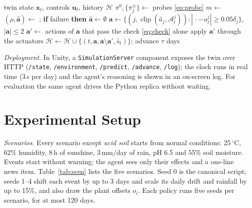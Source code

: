 \documentclass[conference]{IEEEtran}
\newcommand{\clip}{\operatorname{clip}}
\begin{document}
\begin{algorithm}[t]
\caption{One agent tick}\label{alg:tick}
\small
\begin{algorithmic}[1]
\Require twin state $\mathbf x_t$, controls $\mathbf u_t$, history $\mathcal H$
\State $\pi^0,\{\pi_j^\pm\}\gets$ probes \eqref{eq:probe} 
\State $m\gets$ 
\State $(\rho,\hat{\mathbf a})\gets$ ; \textbf{if} failure \textbf{then} $\hat{\mathbf a}\gets\emptyset$
\State $\mathbf a\gets\{(j,\clip(\hat a_j,\mathcal A_t^j)) : |\,\cdot-u_t^j|\ge0.05\delta_j\}$, $|\mathbf a|\le2$
\State $\mathbf a'\gets$ actions of $\mathbf a$ that pass the check \eqref{eq:check} alone
  \State apply $\mathbf a'$ through the actuators
\EndIf
\State $\mathcal H\gets\mathcal H\cup\{(t,\mathbf a,\mathbf a\setminus\mathbf a',\hat s_t)\}$; advance $\tau$ days
\end{algorithmic}
\end{algorithm}

\textit{Deployment.} In Unity, a \texttt{SimulationServer} component exposes the twin over HTTP
(\texttt{/state}, \texttt{/environment}, \texttt{/predict}, \texttt{/advance}, \texttt{/log}); the
clock runs in real time (3\,s per day) and the agent's reasoning is shown in an on-screen log. For
evaluation the same agent drives the Python replica without waiting.

\section{Experimental Setup}\label{sec:setup}

\textit{Scenarios.} Every scenario except \emph{acid soil} starts from normal conditions:
25\,$^\circ$C, 62\% humidity, 8\,h of sunshine, 3\,mm/day of rain, pH 6.5 and 55\% soil moisture.
Events start without warning; the agent sees only their effects and a one-line news item.
Table~\ref{tab:scen} lists the five scenarios. Seed 0 is the canonical script; seeds 1--4 shift
each event by up to 3 days and scale its daily drift and rainfall by up to 15\%, and also draw
the plant offsets $o_i$. Each policy runs five seeds per scenario, for at most 120 days.
\end{document}
